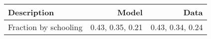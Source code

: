 \begin{tabular}{lrr}
\hline
Description & Model  & Data  \\ 
\hline
Fraction by schooling & 0.43, 0.35, 0.21  & 0.43, 0.34, 0.24  \\ 
\hline
\end{tabular}%
